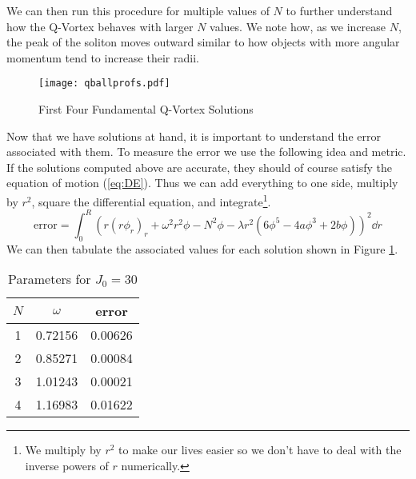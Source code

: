 We can then run this procedure for multiple values of $N$ to further understand how the Q-Vortex behaves with larger $N$ values. We note how, as we increase $N$, the peak of the soliton moves outward similar to how objects with more angular momentum tend to increase their radii.
\begin{figure}[H]
\centering
  \texttt{[image: qballprofs.pdf]}
  \caption{First Four Fundamental Q-Vortex Solutions}
  \label{fig:profiles}
\end{figure}
Now that we have solutions at hand, it is important to understand the error associated with them. To measure the error we use the following idea and metric. If the solutions computed above are accurate, they should of course satisfy the equation of motion (\ref{eq:DE}). Thus we can add everything to one side, multiply by $r^2$, square the differential equation, and integrate\footnote{We multiply by $r^2$ to make our lives easier so we don't have to deal with the inverse powers of $r$ numerically.}.
\begin{equation}
\mathrm{error} = \int_0^R \left(r\left(r\phi_{r}\right)_r + \omega^2r^2\phi - N^2\phi - \lambda r^2\left(6\phi^5 - 4a\phi^3 + 2b\phi\right)\right)^2\dd{r}
\end{equation}
We can then tabulate the associated values for each solution shown in Figure \ref{fig:profiles}.
\begin{table}[H]
    \centering
    \begin{tabular}{| c | c | c |} \hline
    $N$ & $\omega$ & error \\ \hline
    1 & 0.72156 & 0.00626 \\ \hline
    2 & 0.85271 & 0.00084 \\ \hline
    3 & 1.01243 & 0.00021 \\ \hline
    4 & 1.16983 & 0.01622 \\ \hline
    \end{tabular}
    \caption{Parameters for $J_0 = 30$}
    \label{tab:params}
\end{table}

